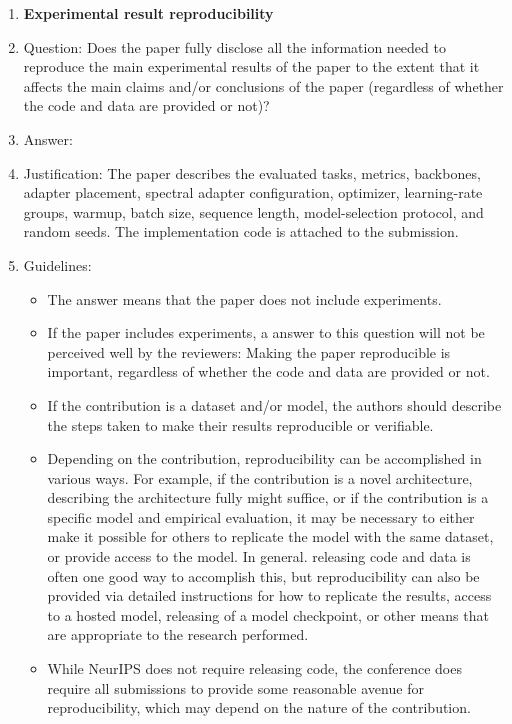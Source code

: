 \begin{enumerate}
\item {\bf Experimental result reproducibility}
    \item[] Question: Does the paper fully disclose all the information needed to reproduce the main experimental results of the paper to the extent that it affects the main claims and/or conclusions of the paper (regardless of whether the code and data are provided or not)?
    \item[] Answer: \answerYes{}
    \item[] Justification: The paper describes the evaluated tasks, metrics, backbones, adapter placement, spectral adapter configuration, optimizer, learning-rate groups, warmup, batch size, sequence length, model-selection protocol, and random seeds. The implementation code is attached to the submission. 
    \item[] Guidelines:
    \begin{itemize}
        \item The answer \answerNA{} means that the paper does not include experiments.
        \item If the paper includes experiments, a \answerNo{} answer to this question will not be perceived well by the reviewers: Making the paper reproducible is important, regardless of whether the code and data are provided or not.
        \item If the contribution is a dataset and\slash or model, the authors should describe the steps taken to make their results reproducible or verifiable. 
        \item Depending on the contribution, reproducibility can be accomplished in various ways. For example, if the contribution is a novel architecture, describing the architecture fully might suffice, or if the contribution is a specific model and empirical evaluation, it may be necessary to either make it possible for others to replicate the model with the same dataset, or provide access to the model. In general. releasing code and data is often one good way to accomplish this, but reproducibility can also be provided via detailed instructions for how to replicate the results, access to a hosted model, releasing of a model checkpoint, or other means that are appropriate to the research performed.
        \item While NeurIPS does not require releasing code, the conference does require all submissions to provide some reasonable avenue for reproducibility, which may depend on the nature of the contribution.
    \end{itemize}


\end{enumerate}
